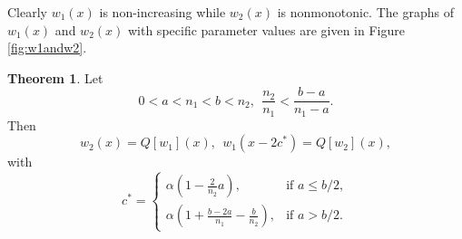 \documentclass[11pt]{article}
\numberwithin{equation}{section}
\theoremstyle{definition}
\newtheorem{theorem}{Theorem}[section]
\begin{document}
Clearly $w_1(x)$ is non-increasing while $w_2(x)$ is nonmonotonic. The graphs of $w_1(x)$ and $w_2(x)$ with specific parameter values are given in Figure \ref{fig:w1andw2}.



\begin{theorem}\label{thm1}
Let
\begin{equation} \label{h1}
0<a<n_1<b<n_2, \  \   \frac{n_2}{n_1} < \frac{b-a}{n_1-a}.
\end{equation}
Then 
$$w_2(x)=Q[w_1](x),  \   \   w_1(x-2c^*)=Q[w_2](x),$$
 with 
\begin{equation} \label{c}
c^* = \begin{cases}
\alpha \left( 1 - \frac{2}{n_2}a \right), & \text{if } a \leq b/2, \\
\alpha \left( 1  + \frac{b - 2a}{n_1} - \frac{b}{n_2} \right), & \text{if }a > b/2.
\end{cases}
\end{equation}
\end{theorem}
\end{document}

